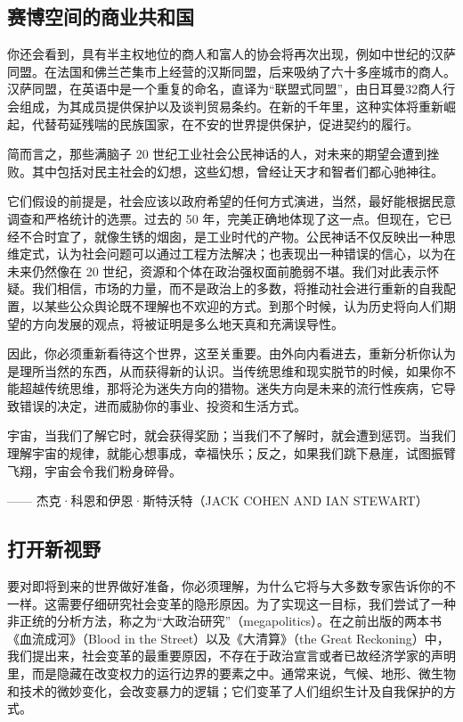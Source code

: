 \subsection{赛博空间的商业共和国}
你还会看到，具有半主权地位的商人和富人的协会将再次出现，例如中世纪的汉萨同盟。在法国和佛兰芒集市上经营的汉斯同盟，后来吸纳了六十多座城市的商人。汉萨同盟，在英语中是一个重复的命名，直译为“联盟式同盟”，由日耳曼32商人行会组成，为其成员提供保护以及谈判贸易条约。在新的千年里，这种实体将重新崛起，代替苟延残喘的民族国家，在不安的世界提供保护，促进契约的履行。


简而言之，那些满脑子 20 世纪工业社会公民神话的人，对未来的期望会遭到挫败。其中包括对民主社会的幻想，这些幻想，曾经让天才和智者们都心驰神往。


它们假设的前提是，社会应该以政府希望的任何方式演进，当然，最好能根据民意调查和严格统计的选票。过去的 50 年，完美正确地体现了这一点。但现在，它已经不合时宜了，就像生锈的烟囱，是工业时代的产物。公民神话不仅反映出一种思维定式，认为社会问题可以通过工程方法解决；也表现出一种错误的信心，以为在未来仍然像在 20 世纪，资源和个体在政治强权面前脆弱不堪。我们对此表示怀疑。我们相信，市场的力量，而不是政治上的多数，将推动社会进行重新的自我配置，以某些公众舆论既不理解也不欢迎的方式。到那个时候，认为历史将向人们期望的方向发展的观点，将被证明是多么地天真和充满误导性。


因此，你必须重新看待这个世界，这至关重要。由外向内看进去，重新分析你认为是理所当然的东西，从而获得新的认识。当传统思维和现实脱节的时候，如果你不能超越传统思维，那将沦为迷失方向的猎物。迷失方向是未来的流行性疾病，它导致错误的决定，进而威胁你的事业、投资和生活方式。



\begin{tcolorbox}
宇宙，当我们了解它时，就会获得奖励；当我们不了解时，就会遭到惩罚。当我们理解宇宙的规律，就能心想事成，幸福快乐；反之，如果我们跳下悬崖，试图振臂飞翔，宇宙会令我们粉身碎骨。
\begin{flushright}
—— 杰克·科恩和伊恩·斯特沃特（JACK COHEN AND IAN STEWART）
\end{flushright}
\end{tcolorbox}

\subsection{打开新视野}

要对即将到来的世界做好准备，你必须理解，为什么它将与大多数专家告诉你的不一样。这需要仔细研究社会变革的隐形原因。为了实现这一目标，我们尝试了一种非正统的分析方法，称之为“大政治研究”（megapolitics）。在之前出版的两本书《血流成河》（Blood in the Street）以及《大清算》（the Great Reckoning）中，我们提出来，社会变革的最重要原因，不存在于政治宣言或者已故经济学家的声明里，而是隐藏在改变权力的运行边界的要素之中。通常来说，气候、地形、微生物和技术的微妙变化，会改变暴力的逻辑；它们变革了人们组织生计及自我保护的方式。


